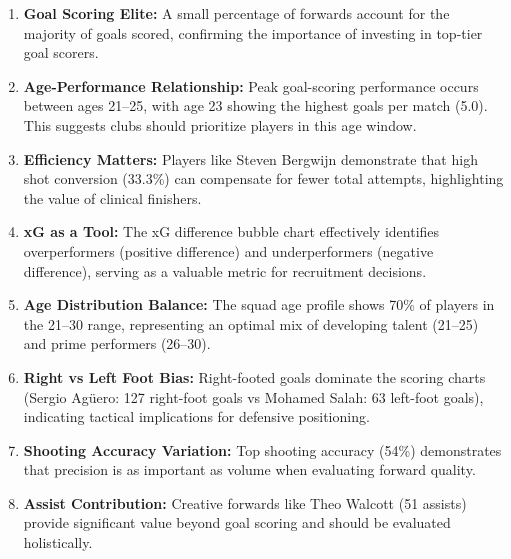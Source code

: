 \documentclass[12pt,a4paper]{article}
\begin{document}
\begin{enumerate}[leftmargin=1.2cm, label=\textcolor{accent}{\textbf{\arabic*.}}]
    \item \textbf{Goal Scoring Elite:} A small percentage of forwards account for the majority of goals scored, confirming the importance of investing in top-tier goal scorers.
    
    \item \textbf{Age-Performance Relationship:} Peak goal-scoring performance occurs between ages 21–25, with age 23 showing the highest goals per match (5.0). This suggests clubs should prioritize players in this age window.
    
    \item \textbf{Efficiency Matters:} Players like Steven Bergwijn demonstrate that high shot conversion (33.3\%) can compensate for fewer total attempts, highlighting the value of clinical finishers.
    
    \item \textbf{xG as a Tool:} The xG difference bubble chart effectively identifies overperformers (positive difference) and underperformers (negative difference), serving as a valuable metric for recruitment decisions.
    
    \item \textbf{Age Distribution Balance:} The squad age profile shows 70\% of players in the 21–30 range, representing an optimal mix of developing talent (21–25) and prime performers (26–30).
    
    \item \textbf{Right vs Left Foot Bias:} Right-footed goals dominate the scoring charts (Sergio Agüero: 127 right-foot goals vs Mohamed Salah: 63 left-foot goals), indicating tactical implications for defensive positioning.
    
    \item \textbf{Shooting Accuracy Variation:} Top shooting accuracy (54\%) demonstrates that precision is as important as volume when evaluating forward quality.
    
    \item \textbf{Assist Contribution:} Creative forwards like Theo Walcott (51 assists) provide significant value beyond goal scoring and should be evaluated holistically.
\end{enumerate}

\vspace{0.3cm}
\end{document}
